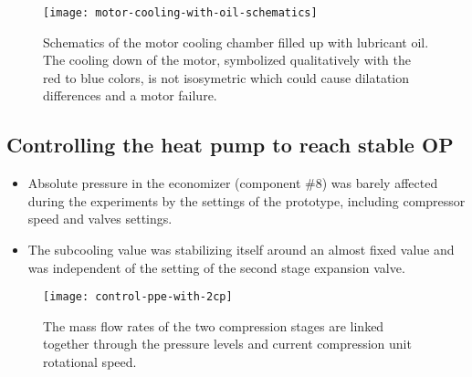 \begin{figure}[htbp]
  \centering
  \texttt{[image: motor-cooling-with-oil-schematics]}
  \caption[Schematic of the motor cooling chamber filled up with
  lubricant oil]{Schematics of the motor cooling chamber filled up
    with lubricant oil. The cooling down of the motor, symbolized
    qualitatively with the red to blue colors, is not isosymetric
    which could cause dilatation differences and a motor failure.}
  \label{fig:awp-motor-with-oil}
\end{figure}

\subsection{Controlling the heat pump to reach stable OP}
\label{sec:awp-issue-control}

\begin{itemize}
\item Absolute pressure in the economizer (component
  \#8) was barely affected during the experiments by
  the settings of the prototype, including compressor speed and valves
  settings.
  \item The subcooling value was stabilizing itself around an almost
  fixed value and was independent of the setting of the second stage
  expansion valve.
\end{itemize}

\begin{figure}[htbp]
  \centering
  \texttt{[image: control-ppe-with-2cp]}
  \caption{The mass flow rates of the two compression stages are
    linked together through the pressure levels and current
    compression unit rotational speed. }
  \label{fig:awp-control-ppe-2cp}
\end{figure}

